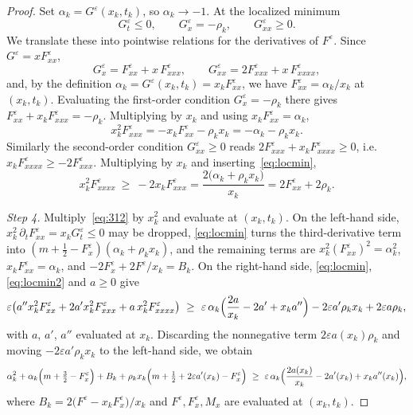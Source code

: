 \documentclass[12pt]{amsart}
\numberwithin{equation}{section}
\theoremstyle{plain}
\theoremstyle{definition}
\newcommand{\eps}{\varepsilon}
\renewcommand{\d}{\partial}
\begin{document}
\begin{proof}
	Set $\alpha_k=G^\eps(x_k,t_k)$, so
	$\alpha_k\to-1$. At
	the localized minimum
	\[
		G^\eps_t\le0,\qquad G^\eps_x=-\rho_k,\qquad G^\eps_{xx}\ge0 .
	\]
	We translate these into pointwise relations for the derivatives of $F^\eps$.
	Since $G^\eps=xF^\eps_{xx}$,
	\[
		G^\eps_x=F^\eps_{xx}+x\,F^\eps_{xxx},
		\qquad
		G^\eps_{xx}=2F^\eps_{xxx}+x\,F^\eps_{xxxx},
	\]
	and, by the definition $\alpha_k=G^\eps(x_k,t_k)=x_kF^\eps_{xx}$, we have
	$F^\eps_{xx}=\alpha_k/x_k$ at $(x_k,t_k)$. Evaluating the first-order
	condition $G^\eps_x=-\rho_k$ there gives
	$F^\eps_{xx}+x_kF^\eps_{xxx}=-\rho_k$.
	Multiplying by $x_k$ and using $x_kF^\eps_{xx}=\alpha_k$,
	\begin{equation}\label{eq:locmin}
		x_k^2F^\eps_{xxx}=-x_kF^\eps_{xx}-\rho_k x_k=-\alpha_k-\rho_k x_k .
	\end{equation}
	Similarly the second-order condition $G^\eps_{xx}\ge0$ reads
	$2F^\eps_{xxx}+x_kF^\eps_{xxxx}\ge0$,
	i.e.\ $x_kF^\eps_{xxxx}\ge-2F^\eps_{xxx}$.
	Multiplying by $x_k$ and inserting~\eqref{eq:locmin},
	\begin{equation}\label{eq:locmin2}
		x_k^2F^\eps_{xxxx}\ \ge\ -2x_kF^\eps_{xxx}
		=\frac{2\bigl(\alpha_k+\rho_k x_k\bigr)}{x_k}
		=2F^\eps_{xx}+2\rho_k .
	\end{equation}

	\emph{Step 4.}
	Multiply~\eqref{eq:312} by $x_k^2$ and evaluate at $(x_k,t_k)$. On the
	left-hand side, $x_k^{2}\,\d_tF^\eps_{xx}=x_kG^\eps_t\le0$ may be dropped,
	\eqref{eq:locmin} turns the third-derivative term into
	$(m+\tfrac12-F^\eps_x)(\alpha_k+\rho_kx_k)$, and the remaining terms are
	$x_k^{2}(F^\eps_{xx})^{2}=\alpha_k^{2}$, $x_kF^\eps_{xx}=\alpha_k$, and
	$-2F^\eps_x+2F^\eps/x_k=B_k$. On the right-hand side, \eqref{eq:locmin},
	\eqref{eq:locmin2} and $a\ge0$ give
	\[
		\eps\bigl(a''x_k^{2}F^\eps_{xx}+2a'x_k^{2}F^\eps_{xxx}
		+a\,x_k^{2}F^\eps_{xxxx}\bigr)
		\ \ge\
		\eps\,\alpha_k\Bigl(\frac{2a}{x_k}-2a'+x_ka''\Bigr)
		-2\eps a'\rho_kx_k+2\eps a\rho_k ,
	\]
	with $a$, $a'$, $a''$ evaluated at $x_k$. Discarding the nonnegative term
	$2\eps a(x_k)\rho_k$ and moving $-2\eps a'\rho_kx_k$ to the left-hand side,
	we obtain
	\begin{equation}\label{eq:locineq}
		\alpha_k^2+\alpha_k\Bigl(m+\tfrac32-F^\eps_x\Bigr)+B_k
		+\rho_k x_k\Bigl(m+\tfrac12+2\eps a'(x_k)-F^\eps_x\Bigr)
		\ \ge\
		\eps\,\alpha_k\Bigl(\frac{2a(x_k)}{x_k}-2a'(x_k)+x_k a''(x_k)\Bigr),
	\end{equation}
	where $B_k=2\bigl(F^\eps-x_k F^\eps_x\bigr)/x_k$ and $F^\eps,F^\eps_x,M_x$ are
	evaluated at $(x_k,t_k)$.


\end{proof}
\end{document}
